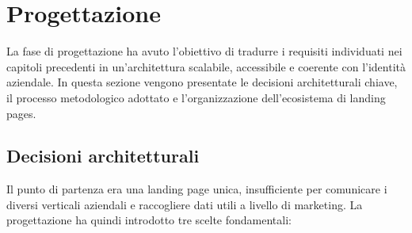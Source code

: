 \chapter{Progettazione}

La fase di progettazione ha avuto l'obiettivo di tradurre i requisiti individuati
nei capitoli precedenti in un'architettura scalabile, accessibile e coerente con
l'identità aziendale. In questa sezione vengono presentate le decisioni
architetturali chiave, il processo metodologico adottato e l'organizzazione
dell'ecosistema di landing pages.

\section{Decisioni architetturali}
Il punto di partenza era una landing page unica, insufficiente per comunicare i
diversi verticali aziendali e raccogliere dati utili a livello di marketing. La
progettazione ha quindi introdotto tre scelte fondamentali:

